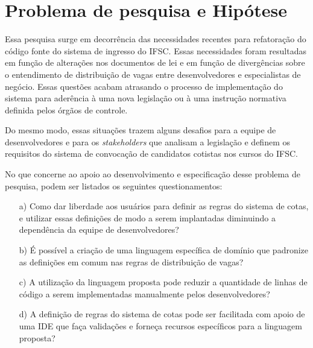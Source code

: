 \section{Problema de pesquisa e Hipótese}
\label{problema}

Essa pesquisa surge em decorrência das necessidades recentes para refatoração do código fonte do sistema de ingresso do \gls{IFSC}. Essas necessidades foram resultadas em função de alterações nos documentos de lei e em função de  divergências sobre o entendimento de distribuição de vagas entre desenvolvedores e especialistas de negócio. Essas questões acabam atrasando o processo de implementação do sistema para aderência à uma nova legislação ou à uma instrução normativa definida pelos órgãos de controle.

Do mesmo modo, essas situações trazem alguns desafios para a equipe de desenvolvedores e para os \textit{stakeholders} que analisam a legislação e definem os requisitos do sistema de convocação de candidatos cotistas nos cursos do \gls{IFSC}. 

No que concerne ao apoio ao desenvolvimento e especificação desse problema de pesquisa, podem ser listados os seguintes questionamentos:

\begin{enumerate}
    \item[a)] Como dar liberdade aos usuários para definir as regras do sistema de cotas, e utilizar essas definições de modo a serem implantadas diminuindo a dependência da equipe de  desenvolvedores?
    
    \item[b)] É possível a criação de uma linguagem específica de domínio que padronize as definições em comum nas regras de distribuição de vagas?
    
    \item[c)] A utilização da linguagem proposta pode reduzir a quantidade de linhas de código a serem implementadas manualmente pelos desenvolvedores?
    
    \item[d)] A definição de regras do sistema de cotas pode ser facilitada com apoio de uma \gls{IDE} que faça validações e forneça recursos específicos para a linguagem proposta?
    

    
\end{enumerate}